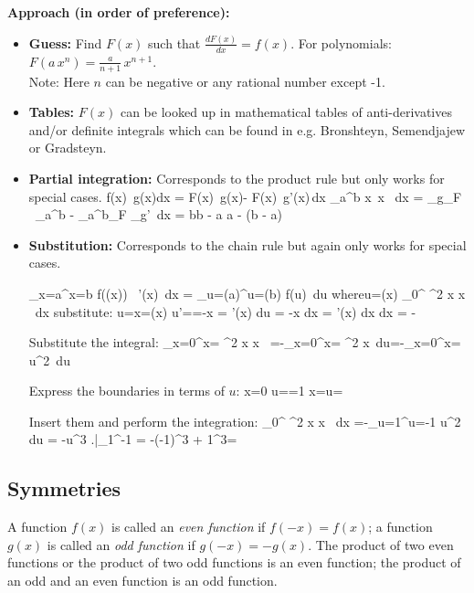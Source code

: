 {\bf Approach (in order of preference):}
\begin{itemize}
\item {\bf Guess:} Find $F(x)$ such that $\frac{dF(x)}{dx} = f(x)$. For polynomials: $F(a\,x^n)=\frac{a}{n+1}\,x^{n+1}$.
\vspace*{2mm} \\ Note: Here $n$ can be negative or any rational number except -1. \\
\item {\bf Tables:} $F(x)$ can be looked up in mathematical tables of anti-derivatives and/or definite integrals
which can be found in e.g. Bronshteyn, Semendjajew or Gradsteyn.\\
\item {\bf Partial integration:} Corresponds to the product rule but only works for special cases.
\bnn \int f(x)\, g(x)dx = F(x)\, g(x)-\int \: F(x)\, g'(x)\,dx \enn
\bnn
\int_a^b x\, \cosh x \, dx = _{g}_{F} \, \arrowvert_a^b
   - \int_a^b_{F} _{g'}\, dx
   = b\sinh b - a \sinh a - (\cosh b - \cosh a)
\enn \svs
\item {\bf Substitution:} Corresponds to the chain rule but again only works for special cases.

\bnn
\int_{x=a}^{x=b} f(\phi(x)) \, \phi'(x)\, dx = \int_{u=\phi(a)}^{u=\phi(b)} f(u)\, du \qquad \mbox{where}\qquad u=\phi(x)
\enn \vs
\bnn \int_0^{\pi} \cos^2 x \; \sin x \, dx \quad \mbox{substitute:} \quad u=\cos x=\phi(x) \enn \vs
\bnn
  u'==-\sin x = \phi'(x) \quad \rightarrow \quad
  du = -\sin x dx = \phi'(x) dx \quad \rightarrow\quad dx = -
\enn \vs

Substitute the integral:
\bnn
\int_{x=0}^{x=\pi} \cos^2 x \; \sin x \, =-\int_{x=0}^{x=\pi} \cos^2 x \,du=-\int_{x=0}^{x=\pi} u^2 \,du
\enn \vs

Express the boundaries in terms of $u$:
\bnn x=0 \quad \rightarrow\quad u==1 \qquad\qquad\qquad\qquad x=\pi \quad \rightarrow\quad u=\cos {} \enn \svs

Insert them and perform the integration:
\bnn
\int_0^{\pi} \cos^2 x \; \sin x \, dx
   =-\int_{u=1}^{u=-1} u^2 \, du = -u^3 \! \left.\frac{}{}\right|_1^{-1} 
   = -(-1)^3 + 1^3=
\enn
\end{itemize} \vs

\subsection{Symmetries}
A function $f(x)$ is called an {\em even function} if $f(-x)=f(x)$; a function $g(x)$ is called an {\em odd function}
if $g(-x)=-g(x)$. The product of two even functions or the product of two odd functions is an even function; the product
of an odd and an even function is an odd function.

